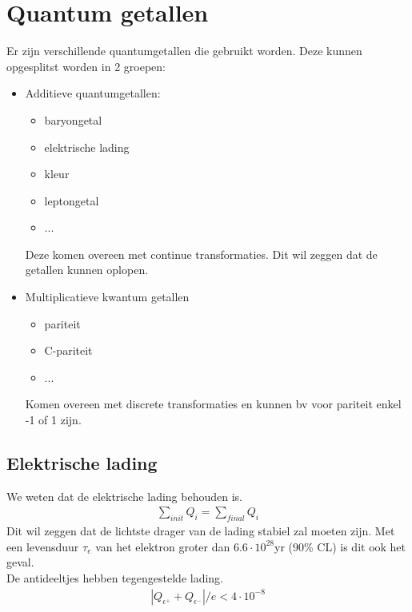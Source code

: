 \documentclass[../main.tex]{subfiles}
\begin{document}
\section{Quantum getallen}%
\label{sec:quantum_getallen}

Er zijn verschillende quantumgetallen die gebruikt worden. Deze kunnen opgesplitst worden in 2 groepen:
\begin{itemize}
    \item Additieve quantumgetallen:
        \begin{itemize}
            \item baryongetal
            \item elektrische lading
            \item kleur
            \item leptongetal
            \item ...
        \end{itemize}
        Deze komen overeen met continue transformaties. Dit wil zeggen dat de getallen kunnen oplopen.
    \item Multiplicatieve kwantum getallen
        \begin{itemize}
            \item pariteit
            \item C-pariteit
            \item ...
        \end{itemize}
        Komen overeen met discrete transformaties en kunnen bv voor pariteit enkel -1 of 1 zijn.
\end{itemize}

\subsection{Elektrische lading}%
\label{sub:elekrische_lading}

We weten dat de elektrische lading behouden is.
\begin{equation}
    \begin{aligned}
        \label{eq:cons_lading}
        \sum_{init} Q_i = \sum_{final} Q_i
    \end{aligned}
\end{equation}
Dit wil zeggen dat de lichtste drager van de lading stabiel zal moeten zijn. Met een levensduur $\tau_e$ van het elektron groter dan $6.6\cdot 10^{28}$yr (90\% CL) is dit ook het geval.\\
De antideeltjes hebben tegengestelde lading.
\begin{equation}
    \begin{aligned}
        \label{eq:anti_deeltje_lading}
        |Q_{\epsilon^+}+Q_{\epsilon^-}|/e < 4\cdot 10^{-8}
    \end{aligned}
\end{equation}
\end{document}
